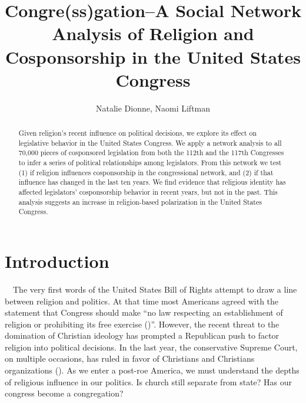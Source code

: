 \documentclass[Royal,times,sageh]{sagej}
\begin{document}

\title{Congre(ss)gation--A Social Network Analysis of Religion and
Cosponsorship in the United States Congress}


\author{Natalie Dionne, Naomi Liftman}




\begin{abstract}
Given religion's recent influence on political decisions, we explore its
effect on legislative behavior in the United States Congress. We apply a
network analysis to all 70,000 pieces of cosponsored legislation from
both the 112th and the 117th Congresses to infer a series of political
relationships among legislators. From this network we test (1) if
religion influences cosponsorship in the congressional network, and (2)
if that influence has changed in the last ten years. We find evidence
that religious identity has affected legislators' cosponsorship behavior
in recent years, but not in the past. This analysis suggests an increase
in religion-based polarization in the United States Congress.
\end{abstract}


\maketitle

\singlespacing

\hypertarget{introduction}{%
\section{Introduction}\label{introduction}}

\doublespacing

~~The very first words of the United States Bill of Rights attempt to
draw a line between religion and politics. At that time most Americans
agreed with the statement that Congress should make ``no law respecting
an establishment of religion or prohibiting its free exercise
(\citet{pp})''. However, the recent threat to the domination of
Christian ideology has prompted a Republican push to factor religion
into political decisions. In the last year, the conservative Supreme
Court, on multiple occasions, has ruled in favor of Christians and
Christians organizations (). As we enter a post-roe America, we must
understand the depths of religious influence in our politics. Is church
still separate from state? Has our congress become a congregation?
\end{document}
